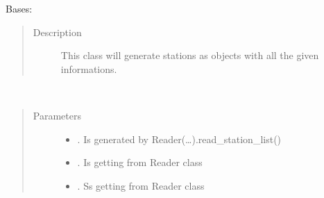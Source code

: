 \documentclass[letterpaper,10pt,english]{sphinxmanual}
\begin{document}
\begin{fulllineitems}
\label{\detokenize{DwdDataPrep:DwdDataPrep.Station}}
\sphinxAtStartPar
Bases: 
\begin{quote}\begin{description}
\item[{Description}] \leavevmode
\sphinxAtStartPar
This class will generate stations as objects with all the given informations.

\end{description}\end{quote}

\begin{fulllineitems}
\label{\detokenize{DwdDataPrep:DwdDataPrep.Station.__init__}}~\begin{quote}\begin{description}
\item[{Parameters}] \leavevmode\begin{itemize}
\item {} 
\sphinxAtStartPar
{} \textendash{} . Is generated by Reader(…).read\_station\_list()

\item {} 
\sphinxAtStartPar
{} \textendash{} . Is getting from Reader class

\item {} 
\sphinxAtStartPar
{} \textendash{} . Ss getting from Reader class

\end{itemize}

\end{description}\end{quote}

\end{fulllineitems}


\end{fulllineitems}
\end{document}
